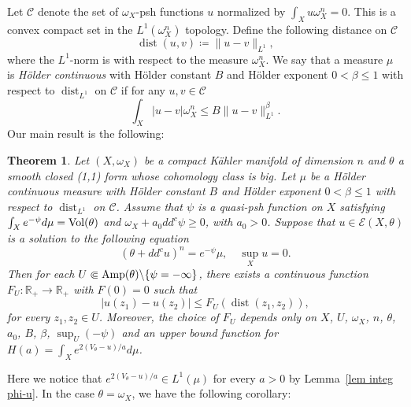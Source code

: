 \documentclass[a4paper,11pt]{amsart}
\numberwithin{equation}{section}
\newtheorem{theorem}{Theorem}[section]
\theoremstyle{definition}
\newcommand{\Vol}{{\rm Vol}}
\newcommand{\dist}{\mathop{\mathrm{dist}}\nolimits}
\newcommand{\ddc}{dd^c}
\newcommand{\R}{\mathbb{R}}
\begin{document}
Let $\mathcal{C}$ denote the set of $\omega_X$-psh functions $u$ normalized by $\int_X u\omega_X^n=0$. This is a
convex compact set in the $L^1(\omega_X^n)$ topology. Define the following distance on $\mathcal{C}$ 
\[\dist(u,v)\coloneqq \|u-v\|_{L^1}, \]
where the $L^1$-norm is with respect to the measure $\omega_X^n$. 
We say that a measure $\mu$ is {\em H\"older continuous}
	 with H\"older constant $B$ and H\"older exponent $0<\beta\leq 1$
	 with respect to $\dist_{L^1}$ on $\mathcal{C}$ if for any $u,v\in\mathcal{C}$
     \[\int_X|u-v|\omega_X^n\leq B\|u-v\|_{L^1}^\beta. \]
Our main result is the following:
\begin{theorem}\label{main} Let $(X,\omega_X)$ be a compact K\"ahler manifold of dimension $n$ and $\theta$ a smooth closed (1,1) form whose cohomology class is big.
	 Let $\mu$ be a H\"older continuous measure 
	 with H\"older constant $B$ and H\"older exponent $0<\beta\leq 1$
	 with respect to $\dist_{L^1}$ on $\mathcal{C}$.
	  Assume that $\psi$ is a quasi-psh function
	 on $X$ satisfying $\int_Xe^{-\psi}d\mu=\Vol(\theta)$ and $\omega_X+a_0dd^c\psi\geq 0$,
	 with $a_0>0$. Suppose that  
	 $u\in\mathcal{E} (X, \theta)$ is a solution to the following equation \begin{equation} (\theta+\ddc u)^n=e^{-\psi}\mu,\quad\sup_X u=0.\end{equation}
	  Then for each $U\Subset{\rm Amp}(\theta)\backslash\{\psi=-\infty\}$, there exists a continuous function $F_U:\R_+\rightarrow\R_+$
	  with $F(0)=0$ such that
	  $$|u(z_1)-u(z_2)|\leq F_U(\dist (z_1, z_2)),$$
	  for every $z_1, z_2\in U$. Moreover, the choice of $F_U$ depends only on  $X$, $U$, $\omega_X$, $n$, $\theta$, $a_0$, $B$, $\beta$, $\sup_U(-\psi)$ and
	  an upper bound function for  $H(a)=\int_Xe^{{2(V_{\theta}-u)}/{a}}d\mu$.
\end{theorem}
Here we notice that $e^{{2(V_{\theta}-u)}/{a}} \in L^1(\mu)$ for every $a>0$ by Lemma~\ref{lem integ phi-u}. In the case $\theta=\omega_X$,
we have the following corollary:
\end{document}
